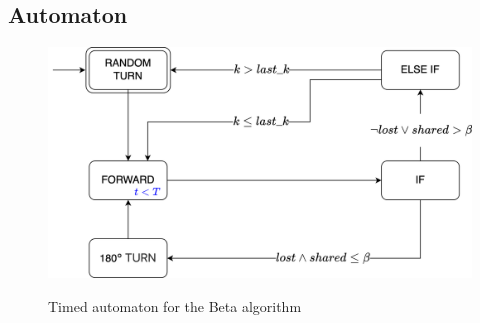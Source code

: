 \subsection{Automaton}

\begin{figure}[H]
\caption{Timed automaton for the Beta algorithm}
\includegraphics[width=\textwidth]{images/beta.png}
\label{fig:automaton}
\end{figure}
